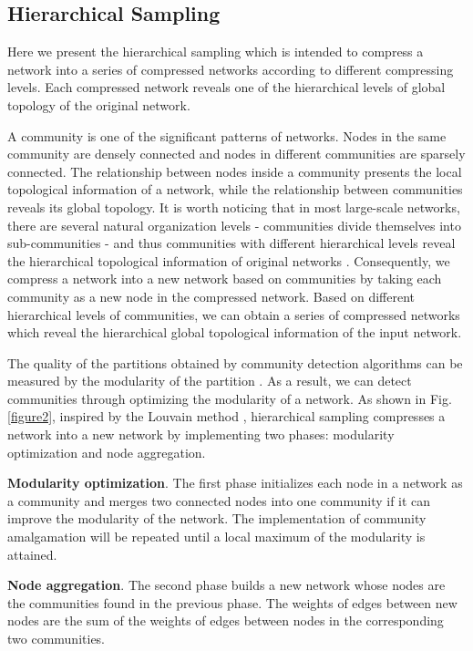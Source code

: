 \documentclass[conference]{IEEEtran}
\begin{document}
\subsection{Hierarchical Sampling}
Here we present the hierarchical sampling which is intended to compress a network into a series of compressed networks according to different compressing levels. Each compressed network reveals one of the hierarchical levels of global topology of the original network.

A community is one of the significant patterns of networks. Nodes in the same community are densely connected and nodes in different communities are sparsely connected. The relationship between nodes inside a community presents the local topological information of a network, while the relationship between communities reveals its global topology. It is worth noticing that in most large-scale networks, there are several natural organization levels - communities divide themselves into sub-communities - and thus communities with different hierarchical levels reveal the hierarchical topological information of original networks \cite{sales2007extracting, blondel2008fast}. Consequently, we compress a network into a new network based on communities by taking each community as a new node in the compressed network. Based on different hierarchical levels of communities, we can obtain a series of compressed networks which reveal the hierarchical global topological information of the input network.

The quality of the partitions obtained by community detection algorithms can be measured by the modularity of the partition \cite{clauset2004finding, blondel2008fast}. As a result, we can detect communities through optimizing the modularity of a network. As shown in Fig.\ref{figure2}, inspired by the Louvain method \cite{blondel2008fast}, hierarchical sampling compresses a network into a new network by implementing two phases: modularity optimization and node aggregation.

\textbf{Modularity optimization}. The first phase initializes each node in a network as a community and merges two connected nodes into one community if it can improve the modularity of the network. The implementation of community amalgamation will be repeated until a local maximum of the modularity is attained. 

\textbf{Node aggregation}. The second phase builds a new network whose nodes are the communities found in the previous phase. The weights of edges between new nodes are the sum of the weights of edges between nodes in the corresponding two communities. 
\end{document}

